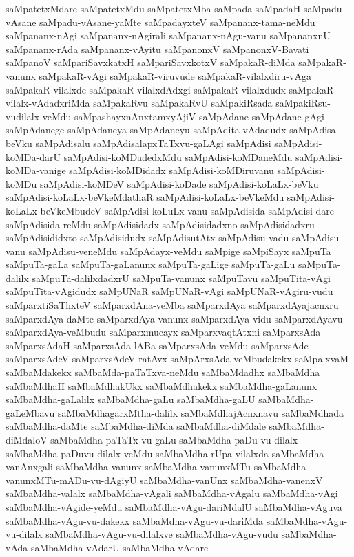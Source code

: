 {saMpatetxMdare
saMpatetxMdu
saMpatetxMba
saMpada
saMpadaH
saMpadu-vAsane
saMpadu-vAsane-yaMte
saMpadayxteV
saMpananx-tama-neMdu
saMpananx-nAgi
saMpananx-nAgirali
saMpananx-nAgu-vanu
saMpananxnU
saMpananx-rAda
saMpananx-vAyitu
saMpanonxV
saMpanonxV-Bavati
saMpanoV
saMpariSavxkatxH
saMpariSavxkotxV
saMpakaR-diMda
saMpakaR-vanunx
saMpakaR-vAgi
saMpakaR-viruvude
saMpakaR-vilalxdiru-vAga
saMpakaR-vilalxde
saMpakaR-vilalxdAdxgi
saMpakaR-vilalxdudx
saMpakaR-vilalx-vAdadxriMda
saMpakaRvu
saMpakaRvU
saMpakiRsada
saMpakiRsu-vudilalx-veMdu
saMpashayxnAnxtamxyAjiV
saMpAdane
saMpAdane-gAgi
saMpAdanege
saMpAdaneya
saMpAdaneyu
saMpAdita-vAdadudx
saMpAdisa-beVku
saMpAdisalu
saMpAdisalapxTaTxvu-gaLAgi
saMpAdisi
saMpAdisi-koMDa-darU
saMpAdisi-koMDadedxMdu
saMpAdisi-koMDaneMdu
saMpAdisi-koMDa-vanige
saMpAdisi-koMDidadx
saMpAdisi-koMDiruvanu
saMpAdisi-koMDu
saMpAdisi-koMDeV
saMpAdisi-koDade
saMpAdisi-koLaLx-beVku
saMpAdisi-koLaLx-beVkeMdathaR
saMpAdisi-koLaLx-beVkeMdu
saMpAdisi-koLaLx-beVkeMbudeV
saMpAdisi-koLuLx-vanu
saMpAdisida
saMpAdisi-dare
saMpAdisida-reMdu
saMpAdisidadx
saMpAdisidadxno
saMpAdisidadxru
saMpAdisididxto
saMpAdisidudx
saMpAdisutAtx
saMpAdisu-vadu
saMpAdisu-vanu
saMpAdisu-veneMdu
saMpAdayx-veMdu
saMpige
saMpiSayx
saMpuTa
saMpuTa-gaLa
saMpuTa-gaLanunx
saMpuTa-gaLige
saMpuTa-gaLu
saMpuTa-dalilx
saMpuTa-dalilxdadxrU
saMpuTa-vanunx
saMpuTavu
saMpuTita-vAgi
saMpuTita-vAgidudx
saMpUNaR
saMpUNaR-vAgi
saMpUNaR-vAgiru-vudu
saMparxtiSaThxteV
saMparxdAna-veMba
saMparxdAya
saMparxdAyajacnxru
saMparxdAya-daMte
saMparxdAya-vanunx
saMparxdAya-vidu
saMparxdAyavu
saMparxdAya-veMbudu
saMparxmucayx
saMparxvaqtAtxni
saMparxsAda
saMparxsAdaH
saMparxsAda-lABa
saMparxsAda-veMdu
saMparxsAde
saMparxsAdeV
saMparxsAdeV-ratAvx
saMpArxsAda-veMbudakekx
saMpalxvaM
saMbaMdakekx
saMbaMda-paTaTxva-neMdu
saMbaMdadhx
saMbaMdha
saMbaMdhaH
saMbaMdhakUkx
saMbaMdhakekx
saMbaMdha-gaLanunx
saMbaMdha-gaLalilx
saMbaMdha-gaLu
saMbaMdha-gaLU
saMbaMdha-gaLeMbavu
saMbaMdhagarxMtha-dalilx
saMbaMdhajAcnxnavu
saMbaMdhada
saMbaMdha-daMte
saMbaMdha-diMda
saMbaMdha-diMdale
saMbaMdha-diMdaloV
saMbaMdha-paTaTx-vu-gaLu
saMbaMdha-paDu-vu-dilalx
saMbaMdha-paDuvu-dilalx-veMdu
saMbaMdha-rUpa-vilalxda
saMbaMdha-vanAnxgali
saMbaMdha-vanunx
saMbaMdha-vanunxMTu
saMbaMdha-vanunxMTu-mADu-vu-dAgiyU
saMbaMdha-vanUnx
saMbaMdha-vanenxV
saMbaMdha-valalx
saMbaMdha-vAgali
saMbaMdha-vAgalu
saMbaMdha-vAgi
saMbaMdha-vAgide-yeMdu
saMbaMdha-vAgu-dariMdalU
saMbaMdha-vAguva
saMbaMdha-vAgu-vu-dakekx
saMbaMdha-vAgu-vu-dariMda
saMbaMdha-vAgu-vu-dilalx
saMbaMdha-vAgu-vu-dilalxve
saMbaMdha-vAgu-vudu
saMbaMdha-vAda
saMbaMdha-vAdarU
saMbaMdha-vAdare
}

